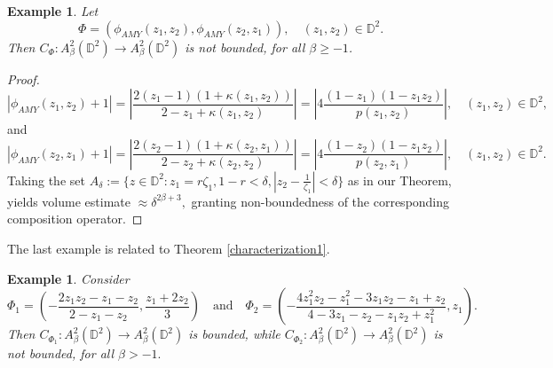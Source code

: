 \documentclass[12pt]{amsart}
\newtheorem{example}[theorem]{Example}
\numberwithin{equation}{section}
\begin{document}
\begin{example} Let $$\Phi=(\phi_{AMY}(z_1,z_2),\phi_{AMY}(z_2,z_1)),\quad (z_1,z_2)\in\mathbb{D}^2.$$ Then $C_{\Phi}:A^2_{\beta}(\mathbb{D}^2)\to A^2_{\beta}(\mathbb{D}^2)$ is not bounded, for all $\beta\ge-1$.
\end{example}
\begin{proof}
$$|\phi_{AMY}(z_1,z_2)+1|=\left|\frac{2(z_1-1)(1+\kappa(z_1,z_2))}{2-z_1+\kappa(z_1,z_2)}\right|=\left|4\frac{(1-z_1)(1-z_1z_2)}{p(z_1,z_2)}\right|, \quad (z_1,z_2)\in \mathbb{D}^2,$$
and
$$|\phi_{AMY}(z_2,z_1)+1|=\left|\frac{2(z_2-1)(1+\kappa(z_2,z_1))}{2-z_2+\kappa(z_2,z_2)}\right|=\left|4\frac{(1-z_2)(1-z_1z_2)}{p(z_2,z_1)}\right|, \quad (z_1,z_2)\in \mathbb{D}^2.$$
Taking the set $A_{\delta}:=\{z\in\mathbb{D}^2: z_1=r\zeta_1, 1-r<\delta,|z_2-\frac{1}{\zeta_1}|<\delta\}$
as in our Theorem, yields volume estimate $\approx \delta^{2\beta+3},$ granting non-boundedness of the corresponding composition operator. 
\end{proof}

The last example is related to Theorem \ref{characterization1}. 

\begin{example} Consider $$\Phi_1=\left(-\frac{2z_1z_2-z_1-z_2}{2-z_1-z_2}, \frac{z_1+2z_2}{3}\right)\quad \mathrm{and}\quad \Phi_2=\left(-\frac{4z_1^2z_2-z_1^2-3z_1z_2-z_1+z_2}{4-3z_1-z_2-z_1z_2+z_1^2},z_1\right).$$ Then $C_{\Phi_1}:A^2_{\beta}(\mathbb{D}^2)\to A^2_{\beta}(\mathbb{D}^2)$ is bounded, while $C_{\Phi_2}:A^2_{\beta}(\mathbb{D}^2)\to A^2_{\beta}(\mathbb{D}^2)$ is not bounded, for all $\beta>-1.$
\end{example}
\end{document}
